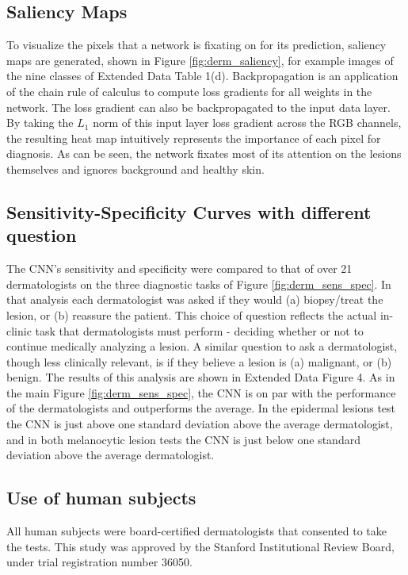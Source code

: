 \subsection{Saliency Maps}
To visualize the pixels that a network is fixating on for its prediction, saliency maps are generated, shown in Figure \ref{fig:derm_saliency}, for example images of the nine classes of Extended Data Table 1(d). Backpropagation is an application of the chain rule of calculus to compute loss gradients for all weights in the network. The loss gradient can also be backpropagated to the input data layer. By taking the $L_1$ norm of this input layer loss gradient across the RGB channels, the resulting heat map intuitively represents the importance of each pixel for diagnosis. As can be seen, the network fixates most of its attention on the lesions themselves and ignores background and healthy skin.

\subsection{Sensitivity-Specificity Curves with different question}
The CNN's sensitivity and specificity were compared to that of over 21 dermatologists on the three diagnostic tasks of Figure \ref{fig:derm_sens_spec}. In that analysis each dermatologist was asked if they would (a) biopsy/treat the lesion, or (b) reassure the patient. This choice of question reflects the actual in-clinic task that dermatologists must perform - deciding whether or not to continue medically analyzing a lesion. A similar question to ask a dermatologist, though less clinically relevant, is if they believe a lesion is (a) malignant, or (b) benign. The results of this analysis are shown in Extended Data Figure 4. As in the main Figure \ref{fig:derm_sens_spec}, the CNN is on par with the performance of the dermatologists and outperforms the average. In the epidermal lesions test the CNN is just above one standard deviation above the average dermatologist, and in both melanocytic lesion tests the CNN is just below one standard deviation above the average dermatologist. 

\subsection{Use of human subjects}
All human subjects were board-certified dermatologists that consented to take the tests. This study was approved by the Stanford Institutional Review Board, under trial registration number 36050.